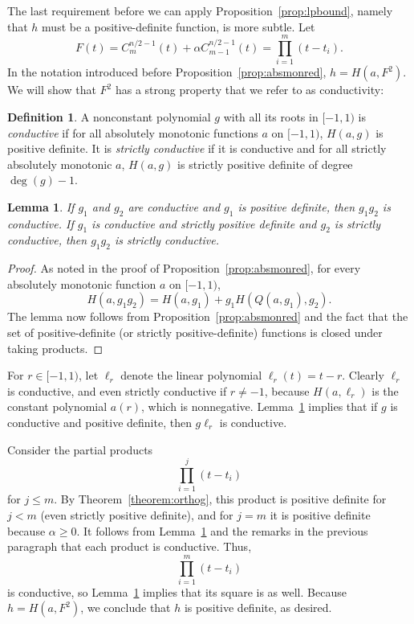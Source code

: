 \documentclass{jams-l}
\theoremstyle{plain}
\newtheorem{lemma}[theorem]{Lemma}
\numberwithin{theorem}{section}
\theoremstyle{definition}
\newtheorem{definition}[theorem]{Definition}
\numberwithin{equation}{section}
\begin{document}
The last requirement before we can apply
Proposition~\ref{prop:lpbound}, namely that $h$ must be a
positive-definite function, is more subtle. Let
$$
F(t) = C_m^{n/2-1}(t)+ \alpha C_{m-1}^{n/2-1}(t) = \prod_{i=1}^m
(t-t_i).
$$
In the notation introduced before
Proposition~\ref{prop:absmonred}, $h = H(a,F^2)$.  We will show
that $F^2$ has a strong property that we refer to as conductivity:

\begin{definition}
A nonconstant polynomial $g$ with all its roots in $[-1,1)$ is
\textit{conductive\/} if for all absolutely monotonic functions
$a$ on $[-1,1)$, $H(a,g)$ is positive definite.  It is
\textit{strictly conductive\/} if it is conductive and for all
strictly absolutely monotonic $a$, $H(a,g)$ is strictly positive
definite of degree $\deg(g)-1$.
\end{definition}

\begin{lemma} \label{lemma:conductivity}
If $g_1$ and $g_2$ are conductive and $g_1$ is positive definite,
then $g_1g_2$ is conductive.  If $g_1$ is conductive and strictly
positive definite and $g_2$ is strictly conductive, then $g_1g_2$
is strictly conductive.
\end{lemma}

\begin{proof}
As noted in the proof of Proposition~\ref{prop:absmonred}, for
every absolutely monotonic function $a$ on $[-1,1)$,
$$
H(a,g_1g_2) = H(a,g_1) + g_1 H(Q(a,g_1),g_2).
$$
The lemma now follows from Proposition~\ref{prop:absmonred} and
the fact that the set of positive-definite (or strictly
positive-definite) functions is closed under taking products.
\end{proof}

For $r \in [-1,1)$, let $\ell_r$ denote the linear polynomial
$\ell_r(t) = t-r$.  Clearly $\ell_r$ is conductive, and even
strictly conductive if $r \ne -1$, because $H(a,\ell_r)$ is the
constant polynomial $a(r)$, which is nonnegative.
Lemma~\ref{lemma:conductivity} implies that if $g$ is conductive
and positive definite, then $g \ell_r$ is conductive.

Consider the partial products
$$
\prod_{i=1}^j (t-t_i)
$$
for $j \le m$.  By Theorem~\ref{theorem:orthog}, this product is
positive definite for $j<m$ (even strictly positive definite), and
for $j=m$ it is positive definite because $\alpha \ge 0$.  It
follows from Lemma~\ref{lemma:conductivity} and the remarks in the
previous paragraph that each product is conductive.  Thus,
$$
\prod_{i=1}^m (t-t_i)
$$
is conductive, so Lemma~\ref{lemma:conductivity} implies that its
square is as well.  Because $h=H(a,F^2)$, we conclude that $h$ is
positive definite, as desired.
\end{document}
